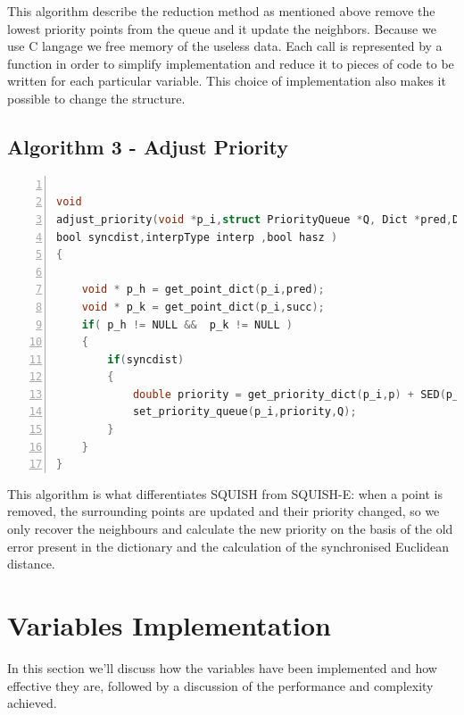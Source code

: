 This algorithm describe the reduction method as mentioned above remove the lowest priority points from the queue and it update the neighbors. Because we use C langage we free memory of the useless data. Each call is represented by a function in order to simplify implementation and reduce it to pieces of code to be written for each particular variable. This choice of implementation also makes it possible to change the structure. 

\subsection{Algorithm 3 - Adjust Priority} 

\begin{minipage}{\linewidth}
\begin{lstlisting}[language=C, % Spécifie le langage du code
caption={adjust\_priority}, % Légende du listing
label=lst:adjust_c, % Étiquette pour référencer le listing
numbers=left,
numberstyle=\tiny\color{gray},
stepnumber=1,
frame=single,
breaklines=true,
postbreak=\mbox{\textcolor{red}{$\hookrightarrow$}\space},
showstringspaces=false
]

void
adjust_priority(void *p_i,struct PriorityQueue *Q, Dict *pred,Dict *succ,PDict  *p,
bool syncdist,interpType interp ,bool hasz )
{

	void * p_h = get_point_dict(p_i,pred);
	void * p_k = get_point_dict(p_i,succ);
	if( p_h != NULL &&  p_k != NULL )
	{
		if(syncdist)
		{
			double priority = get_priority_dict(p_i,p) + SED(p_h,p_i,p_k, interp , hasz );
			set_priority_queue(p_i,priority,Q);
		}
	}
}

\end{lstlisting}
\end{minipage}

This algorithm is what differentiates SQUISH from SQUISH-E: when a point is removed, the surrounding points are updated and their priority changed, so we only recover the neighbours and calculate the new priority on the basis of the old error present in the dictionary and the calculation of the synchronised Euclidean distance. 


\section{Variables Implementation}
In this section we'll discuss how the variables have been implemented and how effective they are, followed by a discussion of the performance and complexity achieved.

